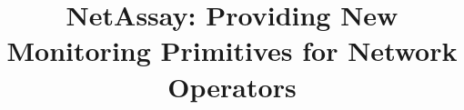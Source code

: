 \documentclass{sig-alternate}
\newcommand\system{NetAssay}
\begin{document}
%

\title{\system{}: Providing New Monitoring Primitives for Network Operators}
%
%
%
%
%
\end{document}
